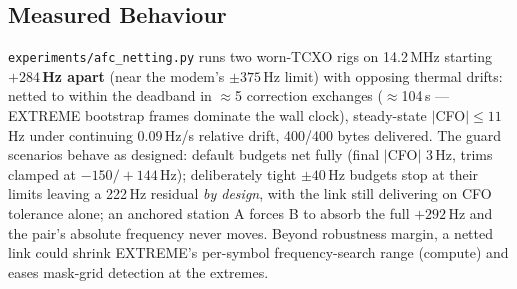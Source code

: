 \subsection{Measured Behaviour}

\texttt{experiments/afc\_netting.py} runs two worn-TCXO rigs on
14.2\,MHz starting \textbf{$+284$\,Hz apart} (near the modem's
$\pm 375$\,Hz limit) with opposing thermal drifts: netted to within
the deadband in $\approx$5 correction exchanges ($\approx$104\,s ---
EXTREME bootstrap frames dominate the wall clock), steady-state
$|$CFO$| \le 11$\,Hz under continuing 0.09\,Hz/s relative drift,
400/400 bytes delivered.  The guard scenarios behave as designed:
default budgets net fully (final $|$CFO$|$ 3\,Hz, trims clamped at
$-150/+144$\,Hz); deliberately tight $\pm 40$\,Hz budgets stop at
their limits leaving a 222\,Hz residual \emph{by design}, with the
link still delivering on CFO tolerance alone; an anchored station A
forces B to absorb the full $+292$\,Hz and the pair's absolute
frequency never moves.  Beyond robustness margin, a netted link could
shrink EXTREME's per-symbol frequency-search range (compute) and eases
mask-grid detection at the extremes.
